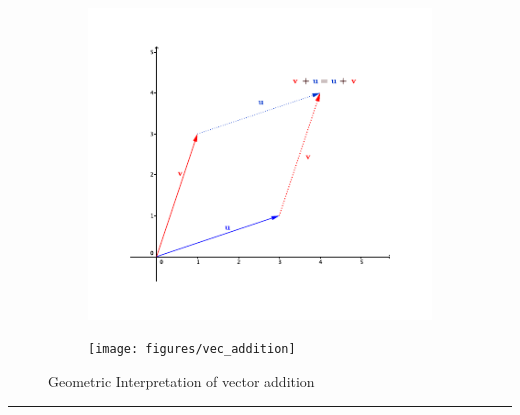  
 
 


\begin{figure}
\centering
\begin{subfigure}{.5\textwidth}
  \centering
  \includegraphics[width=1.1\linewidth]{figures/vec-addition2}
  \caption{}
  \label{fig:sub1}
\end{subfigure}%
\begin{subfigure}{.5\textwidth}
  \centering
  \texttt{[image: figures/vec\_addition]}
  \caption{}
  \label{fig:sub2}
\end{subfigure}
\caption{Geometric Interpretation of vector addition}
\label{fig:test}
\end{figure}





\rule[0.01in]{\textwidth}{0.0025in}



















